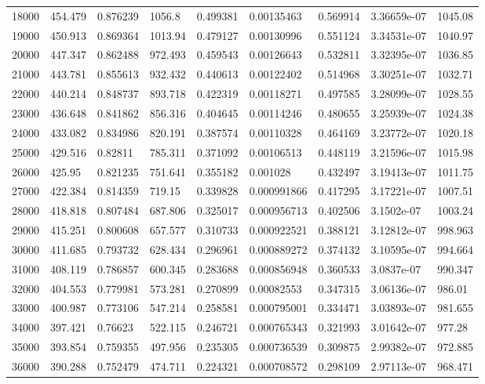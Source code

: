 \begin{tabular}{lllllllll}
18000 & 454.479 & 0.876239 & 1056.8 & 0.499381 & 0.00135463 & 0.569914 & 3.36659e-07 & 1045.08 \\
19000 & 450.913 & 0.869364 & 1013.94 & 0.479127 & 0.00130996 & 0.551124 & 3.34531e-07 & 1040.97 \\
20000 & 447.347 & 0.862488 & 972.493 & 0.459543 & 0.00126643 & 0.532811 & 3.32395e-07 & 1036.85 \\
21000 & 443.781 & 0.855613 & 932.432 & 0.440613 & 0.00122402 & 0.514968 & 3.30251e-07 & 1032.71 \\
22000 & 440.214 & 0.848737 & 893.718 & 0.422319 & 0.00118271 & 0.497585 & 3.28099e-07 & 1028.55 \\
23000 & 436.648 & 0.841862 & 856.316 & 0.404645 & 0.00114246 & 0.480655 & 3.25939e-07 & 1024.38 \\
24000 & 433.082 & 0.834986 & 820.191 & 0.387574 & 0.00110328 & 0.464169 & 3.23772e-07 & 1020.18 \\
25000 & 429.516 & 0.82811 & 785.311 & 0.371092 & 0.00106513 & 0.448119 & 3.21596e-07 & 1015.98 \\
26000 & 425.95 & 0.821235 & 751.641 & 0.355182 & 0.001028 & 0.432497 & 3.19413e-07 & 1011.75 \\
27000 & 422.384 & 0.814359 & 719.15 & 0.339828 & 0.000991866 & 0.417295 & 3.17221e-07 & 1007.51 \\
28000 & 418.818 & 0.807484 & 687.806 & 0.325017 & 0.000956713 & 0.402506 & 3.1502e-07 & 1003.24 \\
29000 & 415.251 & 0.800608 & 657.577 & 0.310733 & 0.000922521 & 0.388121 & 3.12812e-07 & 998.963 \\
30000 & 411.685 & 0.793732 & 628.434 & 0.296961 & 0.000889272 & 0.374132 & 3.10595e-07 & 994.664 \\
31000 & 408.119 & 0.786857 & 600.345 & 0.283688 & 0.000856948 & 0.360533 & 3.0837e-07 & 990.347 \\
32000 & 404.553 & 0.779981 & 573.281 & 0.270899 & 0.00082553 & 0.347315 & 3.06136e-07 & 986.01 \\
33000 & 400.987 & 0.773106 & 547.214 & 0.258581 & 0.000795001 & 0.334471 & 3.03893e-07 & 981.655 \\
34000 & 397.421 & 0.76623 & 522.115 & 0.246721 & 0.000765343 & 0.321993 & 3.01642e-07 & 977.28 \\
35000 & 393.854 & 0.759355 & 497.956 & 0.235305 & 0.000736539 & 0.309875 & 2.99382e-07 & 972.885 \\
36000 & 390.288 & 0.752479 & 474.711 & 0.224321 & 0.000708572 & 0.298109 & 2.97113e-07 & 968.471 \\

\end{tabular}
